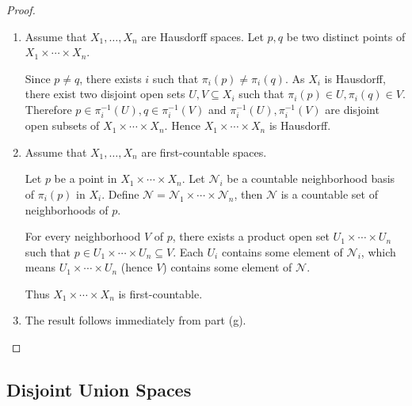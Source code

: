 \begin{proof}
\begin{enumerate}[itemsep=0pt,label={(\alph*)}]
              Consider a product open set \( U_{1} \times \cdots \times U_{n} \) and a point \( (x_{1}, \ldots, x_{n}) \) in it. For each \( i \), there exists \( B_{i} \in \mathcal{B}_{i} \) such that \( x_{i} \in B_{i} \), so
              \[
                  (x_{1}, \ldots, x_{n}) \in B_{1} \times \cdots \times B_{n} \subseteq U_{1} \times \cdots \times U_{n}.
              \]

              Hence \( \mathcal{B} \) is also a basis for the product topology on \( X_{1} \times \cdots \times X_{n} \).
        \item Assume that \( X_{1}, \ldots, X_{n} \) are Hausdorff spaces. Let \( p, q \) be two distinct points of \( X_{1} \times \cdots \times X_{n} \).

              Since \( p \ne q \), there exists \( i \) such that \( \pi_{i}(p) \ne \pi_{i}(q) \). As \( X_{i} \) is Hausdorff, there exist two disjoint open sets \( U, V \subseteq X_{i} \) such that \( \pi_{i}(p) \in U, \pi_{i}(q) \in V \). Therefore \( p \in \pi_{i}^{-1}(U), q \in \pi_{i}^{-1}(V) \) and \( \pi_{i}^{-1}(U), \pi_{i}^{-1}(V) \) are disjoint open subsets of \( X_{1} \times \cdots \times X_{n} \). Hence \( X_{1} \times \cdots \times X_{n} \) is Hausdorff.
        \item Assume that \( X_{1}, \ldots, X_{n} \) are first-countable spaces.

              Let \( p \) be a point in \( X_{1} \times \cdots \times X_{n} \). Let \( \mathcal{N}_{i} \) be a countable neighborhood basis of \( \pi_{i}(p) \) in \( X_{i} \). Define \( \mathcal{N} = \mathcal{N}_{1} \times \cdots \times \mathcal{N}_{n} \), then \( \mathcal{N} \) is a countable set of neighborhoods of \( p \).

              For every neighborhood \( V \) of \( p \), there exists a product open set \( U_{1} \times \cdots \times U_{n} \) such that \( p \in U_{1} \times \cdots \times U_{n} \subseteq V \). Each \( U_{i} \) contains some element of \( \mathcal{N}_{i} \), which means \( U_{1} \times \cdots \times U_{n} \) (hence \( V \)) contains some element of \( \mathcal{N} \).

              Thus \( X_{1} \times \cdots \times X_{n} \) is first-countable.
        \item The result follows immediately from part (g).
    \end{enumerate}
\end{proof}

\subsection{Disjoint Union Spaces}

